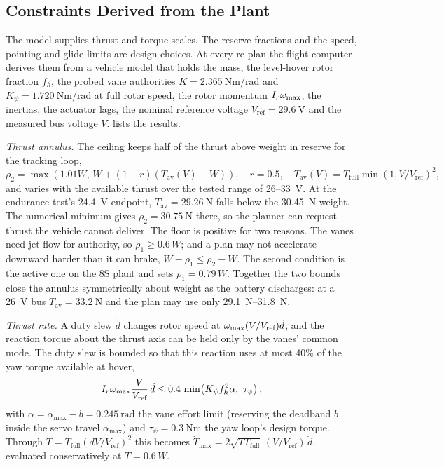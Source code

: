 \documentclass[10pt,letterpaper]{article}
\begin{document}
\subsection{Constraints Derived from the Plant}
\label{sec:limits-derived}

The model supplies thrust and torque scales. The reserve fractions and the speed, pointing and glide limits are design choices.
At every re-plan the flight computer derives them from a vehicle model that holds the mass, the level-hover rotor fraction $f_h$, the probed vane authorities $K = \SI{2.365}{\newton\metre\per\radian}$ and $K_{\psi} = \SI{1.720}{\newton\metre\per\radian}$ at full rotor speed, the rotor momentum $I_r\omega_{\max}$, the inertias, the actuator lags, the nominal reference voltage $V_{\text{ref}} = \SI{29.6}{\volt}$ and the measured bus voltage $V$.
 lists the results.

\textit{Thrust annulus.}
The ceiling keeps half of the thrust above weight in reserve for the tracking loop,
\begin{equation}
\rho_2 = \max\!\left(1.01W,\, W + (1-r)(T_{\text{av}}(V)-W)\right), \quad r=0.5, \quad T_{\text{av}}(V)=T_{\text{full}}\min(1,V/V_{\text{ref}})^2 ,
\label{eq:rho2}
\end{equation}
and varies with the available thrust over the tested range of 26--\SI{33}{\volt}. At the endurance test's \SI{24.4}{\volt} endpoint, $T_{\text{av}}=\SI{29.26}{\newton}$ falls below the \SI{30.45}{\newton} weight. The numerical minimum gives $\rho_2=\SI{30.75}{\newton}$ there, so the planner can request thrust the vehicle cannot deliver.
The floor is positive for two reasons.
The vanes need jet flow for authority, so $\rho_1 \ge 0.6\,W$; and a plan may not accelerate downward harder than it can brake, $W - \rho_1 \le \rho_2 - W$.
The second condition is the active one on the 8S plant and sets $\rho_1 = 0.79\,W$.
Together the two bounds close the annulus symmetrically about weight as the battery discharges: at a \SI{26}{\volt} bus $T_{\text{av}} = \SI{33.2}{\newton}$ and the plan may use only \SIrange{29.1}{31.8}{\newton}.

\textit{Thrust rate.}
A duty slew $\dot d$ changes rotor speed at $\omega_{\max}(V/V_{\text{ref}})\dot d$, and the reaction torque about the thrust axis can be held only by the vanes' common mode.
The duty slew is bounded so that this reaction uses at most 40\% of the yaw torque available at hover,
\begin{equation}
I_r\omega_{\max}\frac{V}{V_{\text{ref}}}\,\dot d \le 0.4\,\min\!\left(K_\psi f_h^2\bar\alpha,\ \tau_{\psi}\right),
\label{eq:dutyrate}
\end{equation}
with $\bar\alpha = \alpha_{\max} - b = \SI{0.245}{\radian}$ the vane effort limit (reserving the deadband $b$ inside the servo travel $\alpha_{\max}$) and $\tau_\psi = \SI{0.3}{\newton\metre}$ the yaw loop's design torque.
Through $T = T_{\text{full}}(d V/V_{\text{ref}})^2$ this becomes $\dot T_{\max} = 2\sqrt{T T_{\text{full}}}\,(V/V_{\text{ref}})\,\dot d$, evaluated conservatively at $T = 0.6\,W$.
\end{document}
